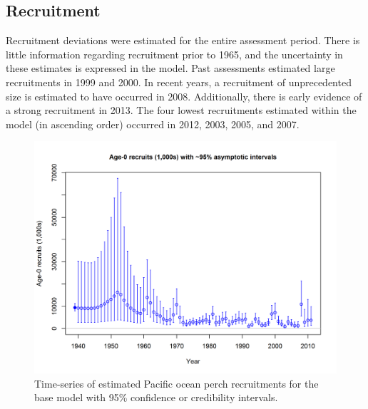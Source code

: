 \documentclass[12pt,]{article}
\begin{document}
\FloatBarrier

\subsection*{Recruitment}\label{recruitment}

Recruitment deviations were estimated for the entire assessment period.
There is little information regarding recruitment prior to 1965, and the
uncertainty in these estimates is expressed in the model. Past
assessments estimated large recruitments in 1999 and 2000. In recent
years, a recruitment of unprecedented size is estimated to have occurred
in 2008. Additionally, there is early evidence of a strong recruitment
in 2013. The four lowest recruitments estimated within the model (in
ascending order) occurred in 2012, 2003, 2005, and 2007.

\begin{figure}
\centering
\includegraphics{r4ss/plots_mod1/ts11_Age-0_recruits_(1000s)_with_95_asymptotic_intervals.png}
\caption{Time-series of estimated Pacific ocean perch recruitments for
the base model with 95\% confidence or credibility intervals.
\label{fig:Recruits_all}}
\end{figure}
\end{document}
